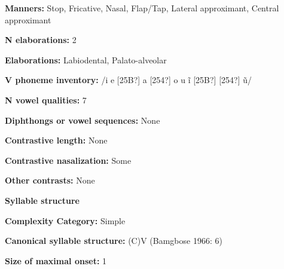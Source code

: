 \begin{styleBody}
\textbf{Manners:} Stop, Fricative, Nasal, Flap/Tap, Lateral approximant, Central approximant
\end{styleBody}

\begin{styleBody}
\textbf{N elaborations:} 2
\end{styleBody}

\begin{styleBody}
\textbf{Elaborations:} Labiodental, Palato-alveolar
\end{styleBody}

\begin{styleBody}
\textbf{V phoneme inventory:} /i e [25B?] a [254?] o u \~{i} [25B?] [254?] \~{u}/
\end{styleBody}

\begin{styleBody}
\textbf{N vowel qualities:} 7
\end{styleBody}

\begin{styleBody}
\textbf{Diphthongs or vowel sequences:} None
\end{styleBody}

\begin{styleBody}
\textbf{Contrastive length:} None
\end{styleBody}

\begin{styleBody}
\textbf{Contrastive nasalization:} Some
\end{styleBody}

\begin{styleBody}
\textbf{Other contrasts:} None
\end{styleBody}

\begin{styleBody}
\textbf{Syllable structure}
\end{styleBody}

\begin{styleBody}
\textbf{Complexity Category:} Simple
\end{styleBody}

\begin{styleBody}
\textbf{Canonical syllable structure:} (C)V\textbf{ }(Bamgbose 1966: 6)
\end{styleBody}

\begin{styleBody}
\textbf{Size of maximal onset:} 1
\end{styleBody}

